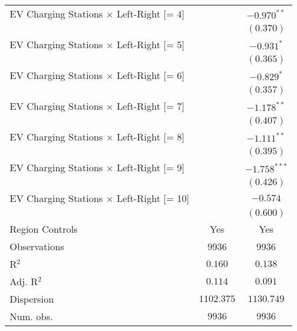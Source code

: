 \begin{center}
\begin{tiny}
\begin{longtable}{l@{} c@{} c@{}}
\quad EV Charging Stations $\times$ Left-Right [= 4]                       &                  & $-0.970^{**}$    \\
                                                                           &                  & $(0.370)$        \\
\quad EV Charging Stations $\times$ Left-Right [= 5]                       &                  & $-0.931^{*}$     \\
                                                                           &                  & $(0.365)$        \\
\quad EV Charging Stations $\times$ Left-Right [= 6]                       &                  & $-0.829^{*}$     \\
                                                                           &                  & $(0.357)$        \\
\quad EV Charging Stations $\times$ Left-Right [= 7]                       &                  & $-1.178^{**}$    \\
                                                                           &                  & $(0.407)$        \\
\quad EV Charging Stations $\times$ Left-Right [= 8]                       &                  & $-1.111^{**}$    \\
                                                                           &                  & $(0.395)$        \\
\quad EV Charging Stations $\times$ Left-Right [= 9]                       &                  & $-1.758^{***}$   \\
                                                                           &                  & $(0.426)$        \\
\quad EV Charging Stations $\times$ Left-Right [= 10]                      &                  & $-0.574$         \\
                                                                           &                  & $(0.600)$        \\
\hline
Region Controls                                                            & Yes              & Yes              \\
Observations                                                               & 9936             & 9936             \\
R$^2$                                                                      & $0.160$          & $0.138$          \\
Adj. R$^2$                                                                 & $0.114$          & $0.091$          \\
Dispersion                                                                 & $1102.375$       & $1130.749$       \\
Num. obs.                                                                  & $9936$           & $9936$           \\
\end{longtable}
\end{tiny}
\end{center}
